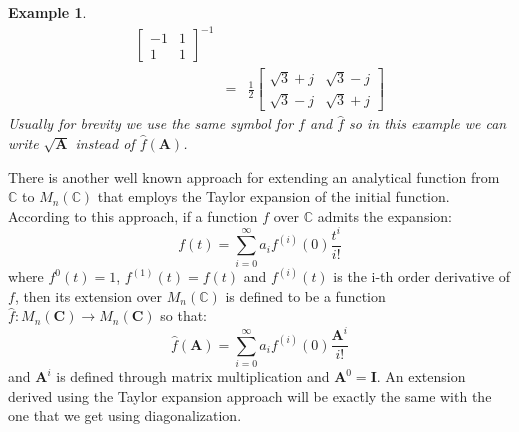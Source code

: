 \documentclass[a4paper,10pt,oneside]{book}
\newtheorem{example}{Example}
\begin{document}
\begin{example}
\begin{eqnarray}
\left[ {\begin{array}{cc} -1 & 1 \\ 1 & 1 \end{array} } \right]^{-1}\\
&=& \frac{1}{2}\left[ {\begin{array}{cc} \sqrt{3}+j & \sqrt{3}-j \\ \sqrt{3}-j & \sqrt{3}+j \end{array} } \right]
\end{eqnarray}
Usually for brevity we use the same symbol for $f$ and $\hat{f}$ so in this example 
we can write $\sqrt{\mathbf{A}}$ instead of $\hat{f}(\mathbf{A})$.
\end{example}

There is another well known approach for extending an analytical function from $\mathbb{C}$ to $M_n(\mathbb{C})$ that employs the Taylor expansion of the initial function. According to this approach, if a function $f$ over $\mathbb{C}$ admits the expansion:
\begin{equation}
 f(t)=\sum_{i=0}^\infty a_i f^{(i)}(0)\frac{t^i}{i!}
\end{equation}
where $f^{0}(t)=1$, $f^{(1)}(t)=f(t)$ and $f^{(i)}(t)$ is the i-th order derivative of $f$, then its extension over $M_n(\mathbb{C})$ is defined to be a function $\hat{f}:M_n(\mathbf{C})\to M_n(\mathbf{C})$ so that:
\begin{equation}
 \hat{f}(\mathbf{A})=\sum_{i=0}^\infty a_i f^{(i)}(0)\frac{\mathbf{A}^i}{i!}
\end{equation}
and $\mathbf{A}^i$ is defined through matrix multiplication and $\mathbf{A}^0=\mathbf{I}$. An extension derived using the Taylor expansion approach will be exactly the same with the one that we get using diagonalization.
\end{document}
